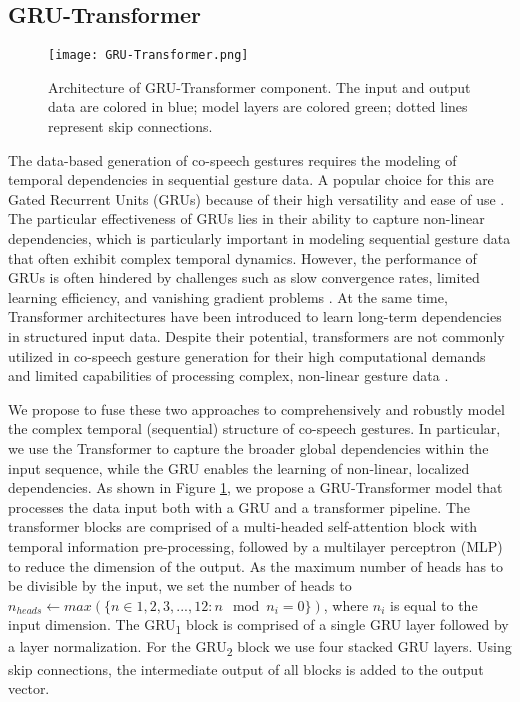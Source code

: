 \documentclass[sigconf]{acmart}
\begin{document}
\subsection{GRU-Transformer}

\begin{figure}[b]
  \centering
  \texttt{[image: GRU-Transformer.png]}
  \caption{Architecture of GRU-Transformer component. The input and output data are colored in blue; model layers are colored green; dotted lines represent skip connections.}
  \label{fig:gesture_gru_transformer}
\end{figure}

The data-based generation of co-speech gestures requires the modeling of temporal dependencies in sequential gesture data. A popular choice for this are Gated Recurrent Units (GRUs) \cite{cho2014learning} because of their high versatility and ease of use \cite{yoonSpeechGestureGeneration2020,liangSEEGSemanticEnergized2022,liuLearningHierarchicalCrossModal2022a,aoRhythmicGesticulatorRhythmAware2022a}. The particular effectiveness of GRUs lies in their ability to capture non-linear dependencies, which is particularly important in modeling sequential gesture data that often exhibit complex temporal dynamics. However, the performance of GRUs is often hindered by challenges such as slow convergence rates, limited learning efficiency, and vanishing gradient problems \cite{wang2019ogru}. At the same time, Transformer architectures \cite{vaswani2017attention} have been introduced to learn long-term dependencies in structured input data. Despite their potential, transformers are not commonly utilized in co-speech gesture generation for their high computational demands and limited capabilities of processing complex, non-linear gesture data \cite{ahuja2020no,bhattacharya2021text2gestures,zhuang2022text}. 

We propose to fuse these two approaches to comprehensively and robustly model the complex temporal (sequential) structure of co-speech gestures. In particular, we use the Transformer to capture the broader global dependencies within the input sequence, while the GRU enables the learning of non-linear, localized dependencies.
As shown in Figure \ref{fig:gesture_gru_transformer}, we propose a GRU-Transformer model that processes the data input both with a GRU and a transformer pipeline. The transformer blocks are comprised of a multi-headed self-attention block with temporal information pre-processing, followed by a multilayer perceptron (MLP) to reduce the dimension of the output. As the maximum number of heads has to be divisible by the input, we set the number of heads to $n_{heads} \leftarrow max(\{n \in {1, 2, 3, ..., 12} : n \mod n_i = 0 \})$, where $n_i$ is equal to the input dimension. 
The GRU\textsubscript{1} block is comprised of a single GRU layer followed by a layer normalization. For the GRU\textsubscript{2} block we use four stacked GRU layers.
Using skip connections, the intermediate output of all blocks is added to the output vector.
\end{document}
